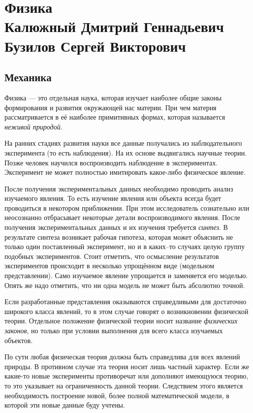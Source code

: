 \part[Физика]{Физика \\
{\Large Калюжный Дмитрий Геннадьевич} \\
{\Large Бузилов Сергей Викторович}
}

\chapter{Механика}

Физика --- это отдельная наука, которая изучает наиболее общие законы
формирования и развития окружающей нас материи. При чем материя рассматривается
в её наиболее примитивных формах, которая называется \emph{неживой природой}.

На ранних стадиях развития науки все данные получались из наблюдательного
эксперимента (то есть наблюдения). На их основе выдвигались научные теории.
Позже человек научился воспроизводить наблюдение в экспериментах. Эксперимент
не может полностью имитировать какое-либо физическое явление.

После получения экспериментальных данных необходимо проводить анализ изучаемого
явления. То есть изучение явления или объекта всегда будет проводиться в
некотором приближении. При этом исследователь сознательно или неосознанно
отбрасывает некоторые детали воспроизводимого явления. После получения
экспериментальных данных и их изучения требуется \emph{синтез}. В результате
синтеза возникает рабочая гипотеза, которая может объяснить не только один
поставленный эксперимент, но и в каких--то случаях целую группу подобных
экспериментов. Стоит отметить, что осмысление результатов экспериментов
происходит в несколько упрощённом виде (модельном представлении). Само
изучаемое явление упрощается и заменяется его моделью. Опять же надо отметить,
что ни одна модель не может быть абсолютно точной.

Если разработанные представления оказываются справедливыми для достаточно
широкого класса явлений, то в этом случае говорят о возникновении физической
теории. Отдельное положение физической теории носит название \emph{физических
	законов}, но только при условии выполнения для всего класса изучаемых объектов.

По сути любая физическая теория должна быть справедлива для всех явлений
природы. В противном случае эта теория носит лишь частный характер. Если же
какие-то новые эксперименты противоречат или дополняют имеющуюся теорию, то
это указывает на ограниченность данной теории. Следствием этого является
необходимость построение новой, более полной математической модели, в
которой эти новые данные буду учтены.


